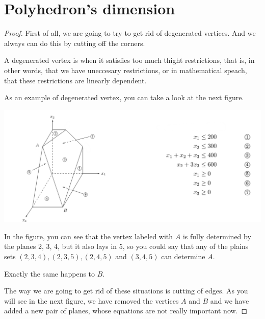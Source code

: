 ﻿\chapter{Polyhedron's dimension}

    
    \begin{proof}
        First of all, we are going to try to get rid of degenerated vertices. And we always can do this
        by cutting off the corners.\pn

        A degenerated vertex is when it satisfies too much thight restrictions, that is, in other words,
        that we have uneccesary restrictions, or in mathematical speach, that these restrictions are
        linearly dependent.\pn

        As an example of degenerated vertex, you can take a look at the next figure.\pn

        \begin{center}
            \includegraphics[width=14cm]{PolyhedronDimension/DegeneratedVertex.png}%
        \end{center}\pn
        
        In the figure, you can see that the vertex labeled with $A$ is fully determined by 
        the planes 2, 3, 4, but it also lays in 5, so you could say that any of the plains sets
        $(2, 3, 4), (2, 3, 5), (2, 4, 5)$ and $(3, 4, 5)$ can determine $A$.\pn
        
        Exactly the same happens to $B$.\pn
        
        The way we are going to get rid of these situations is cutting of edges. As you will see in the
        next figure, we have removed the vertices $A$ and $B$ and we have added a new pair of planes, whose
        equations are not really important now.\pn
        

\end{proof}
